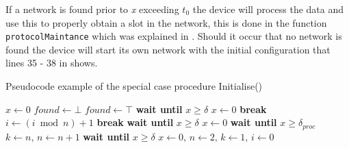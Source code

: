 If a network is found prior to \textit{x} exceeding $t_0$ the device will process the data and use this to properly obtain a slot in the network, this is done in the function \texttt{protocolMaintance} which was explained in .
Should it occur that no network is found the device will start its own network with the initial configuration that lines 35 - 38 in  shows.

\begin{algorithm}[h]
\caption{Pseudocode example of the special case procedure Initialise()}
\label{lst:setupCCRC}
\begin{algorithmic}[1]
    \State $x \gets 0$
    \State $found \gets \bot$
            \State {} 
            \State $found \gets \top$
            \State \textbf{wait until } $x \ge \delta$
            \State $x \gets 0$
            \State \textbf{break}
        \EndIf                                        
    \EndWhile
            \State $i \gets (i \bmod n) + 1$
                    \State {}
                    \State \textbf{break}
                \EndIf
            \EndWhile
            \State \textbf{wait until } $x \ge \delta$
            \State $x \gets 0$ 
        \EndWhile
        \State \textbf{wait until } $x \ge \delta_{proc}$
        \State $k \gets n,\, n \gets n+1$ 
        \State {}  
        \State \textbf{wait until } $x \ge \delta$ 
    \Else
        \State $x \gets 0,\, n \gets 2,\, k \gets 1,\, i \gets 0$ 
    \EndIf
    \State {} 
\EndProcedure        
\end{algorithmic}    
\end{algorithm} 

